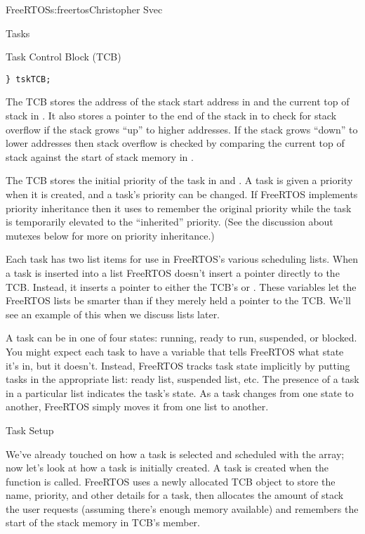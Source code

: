 \begin{aosachapter}{FreeRTOS}{s:freertos}{Christopher Svec}
\begin{aosasect1}{Tasks}
\begin{aosasect2}{Task Control Block (TCB)}
\begin{verbatim}
} tskTCB;
\end{verbatim}

The TCB stores the address of the stack start address in
 and the current top of stack in . It
also stores a pointer to the end of the stack in 
to check for stack overflow if the stack grows ``up'' to higher
addresses. If the stack grows ``down'' to lower addresses then stack
overflow is checked by comparing the current top of stack against the
start of stack memory in .

The TCB stores the initial priority of the task in 
and . A task is given a priority when it is
created, and a task's priority can be changed.  If FreeRTOS
implements priority inheritance then it uses  to
remember the original priority while the task is temporarily elevated
to the ``inherited'' priority. (See the discussion about mutexes below
for more on priority inheritance.)

Each task has two list items for use in FreeRTOS's various scheduling
lists. When a task is inserted into a list FreeRTOS doesn't insert a
pointer directly to the TCB.  Instead, it inserts a pointer to either
the TCB's  or . These
 variables let the FreeRTOS lists be smarter than if
they merely held a pointer to the TCB. We'll see an example of this
when we discuss lists later.

A task can be in one of four states: running, ready to run, suspended,
or blocked.  You might expect each task to have a variable that tells
FreeRTOS what state it's in, but it doesn't. Instead, FreeRTOS tracks
task state implicitly by putting tasks in the appropriate list: ready
list, suspended list, etc. The presence of a task in a particular list
indicates the task's state.  As a task changes from one state to another, 
FreeRTOS simply moves it
from one list to another.

\end{aosasect2}

\begin{aosasect2}{Task Setup}

We've already touched on how a task is selected and scheduled with the
 array; now let's look at how a task is
initially created.  A task is created when the 
function is called.  FreeRTOS uses a newly allocated TCB object to
store the name, priority, and other details for a task, then allocates
the amount of stack the user requests (assuming there's enough memory
available) and remembers the start of the stack memory in TCB's
 member.


\end{aosasect2}
\end{aosasect1}
\end{aosachapter}
